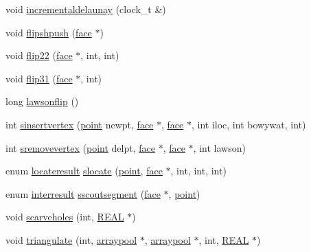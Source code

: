\begin{DoxyCompactItemize}
\item 
void \hyperlink{classtetgenmesh_a5a5a0513d0bea7aa457eb0bc5fad1b02}{incrementaldelaunay} (clock\+\_\+t \&)
\item 
void \hyperlink{classtetgenmesh_a5a83480cb33ea6ceebb125e20d33c324}{flipshpush} (\hyperlink{classtetgenmesh_1_1face}{face} $\ast$)
\item 
void \hyperlink{classtetgenmesh_ac34f0cd148accd132b491f9c6145c6f6}{flip22} (\hyperlink{classtetgenmesh_1_1face}{face} $\ast$, int, int)
\item 
void \hyperlink{classtetgenmesh_a3db30cb237ac5cbcda3ac70a1ea31666}{flip31} (\hyperlink{classtetgenmesh_1_1face}{face} $\ast$, int)
\item 
long \hyperlink{classtetgenmesh_acf60f3a43f8b907d95623b42a88ae968}{lawsonflip} ()
\item 
int \hyperlink{classtetgenmesh_ad48cec74c7fbcf66ebd312661da5d0bc}{sinsertvertex} (\hyperlink{classtetgenmesh_ace3fb4f80389185b7c9b18ab69a3dea2}{point} newpt, \hyperlink{classtetgenmesh_1_1face}{face} $\ast$, \hyperlink{classtetgenmesh_1_1face}{face} $\ast$, int iloc, int bowywat, int)
\item 
int \hyperlink{classtetgenmesh_a7fc2b1bb2e54a5e013edc3e23bd0523b}{sremovevertex} (\hyperlink{classtetgenmesh_ace3fb4f80389185b7c9b18ab69a3dea2}{point} delpt, \hyperlink{classtetgenmesh_1_1face}{face} $\ast$, \hyperlink{classtetgenmesh_1_1face}{face} $\ast$, int lawson)
\item 
enum \hyperlink{classtetgenmesh_a1d02bed7b59566d57b896776d78a6b25}{locateresult} \hyperlink{classtetgenmesh_a9daea5f7abf57b108fb6cc6370ac82e3}{slocate} (\hyperlink{classtetgenmesh_ace3fb4f80389185b7c9b18ab69a3dea2}{point}, \hyperlink{classtetgenmesh_1_1face}{face} $\ast$, int, int, int)
\item 
enum \hyperlink{classtetgenmesh_a01d2be902350e1bf8f20e650d687a793}{interresult} \hyperlink{classtetgenmesh_ab885128bb853ed5a628915e3705d32aa}{sscoutsegment} (\hyperlink{classtetgenmesh_1_1face}{face} $\ast$, \hyperlink{classtetgenmesh_ace3fb4f80389185b7c9b18ab69a3dea2}{point})
\item 
void \hyperlink{classtetgenmesh_a2473a9f86cb5829968a01fdad0d3df7d}{scarveholes} (int, \hyperlink{tetgen_8h_a4b654506f18b8bfd61ad2a29a7e38c25}{R\+E\+AL} $\ast$)
\item 
void \hyperlink{classtetgenmesh_af62b4d5ed09b5a10704caf321e9c5b06}{triangulate} (int, \hyperlink{classtetgenmesh_1_1arraypool}{arraypool} $\ast$, \hyperlink{classtetgenmesh_1_1arraypool}{arraypool} $\ast$, int, \hyperlink{tetgen_8h_a4b654506f18b8bfd61ad2a29a7e38c25}{R\+E\+AL} $\ast$)

\end{DoxyCompactItemize}
